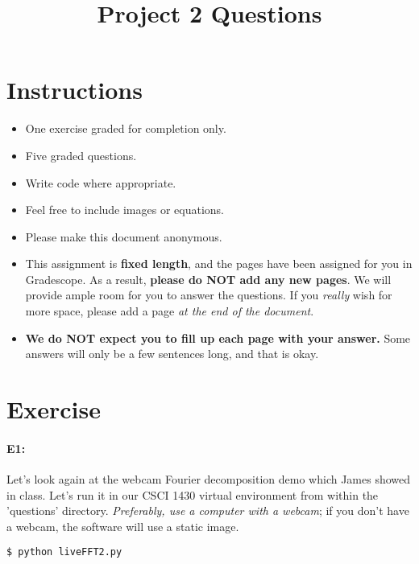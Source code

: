 \date{}

\title{\vspace{-1cm}Project 2 Questions}



\maketitle
\vspace{-3cm}
\thispagestyle{fancy}

\section*{Instructions}
\begin{itemize}
  \item One exercise graded for completion only.
  \item Five graded questions.
  \item Write code where appropriate.
  \item Feel free to include images or equations.
  \item Please make this document anonymous.
  \item This assignment is \textbf{fixed length}, and the pages have been assigned for you in Gradescope. As a result, \textbf{please do NOT add any new pages}. We will provide ample room for you to answer the questions. If you \emph{really} wish for more space, please add a page \emph{at the end of the document}.
  \item \textbf{We do NOT expect you to fill up each page with your answer.} Some answers will only be a few sentences long, and that is okay.
\end{itemize}


\section*{Exercise}

\paragraph{E1:} Let's look again at the webcam Fourier decomposition demo which James showed in class. Let's run it in our CSCI 1430 virtual environment from within the 'questions' directory. \emph{Preferably, use a computer with a webcam}; if you don't have a webcam, the software will use a static image.

\begin{verbatim}
$ python liveFFT2.py
\end{verbatim}

